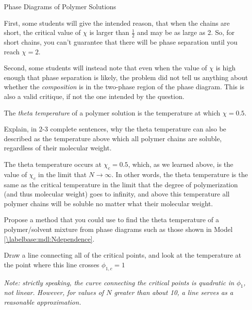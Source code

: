 \begin{activity}{Phase Diagrams of Polymer Solutions}
\begin{ctqs}
\begin{solution}[2.5in]{}
			First, some students will give the intended reason, that when the chains are short, the critical value of $\chi$ is larger than $\frac{1}{2}$ and may be as large as 2.  So, for short chains, you can't guarantee that there will be phase separation until you reach $\chi = 2$.
			
			Second, some students will instead note that even when the value of $\chi$ is high enough that phase separation is likely, the problem did not tell us anything about whether the \emph{composition} is in the two-phase region of the phase diagram.  This is also a valid critique, if not the one intended by the question.
		\end{solution}

\end{ctqs}


\begin{infobox}
	
	The \emph{theta temperature} of a polymer solution is the temperature at which $\chi=0.5$.
	
\end{infobox}


\begin{ctqs}

	\question Explain, in 2-3 complete sentences, why the theta temperature can also be described as the temperature above which all polymer chains are soluble, regardless of their molecular weight.
	
		\begin{solution}[2.25in]{}
			The theta temperature occurs at $\chi_c =0.5$, which, as we learned above, is the value of $\chi_c$ in the limit that $N\to\infty$.  In other words, the theta temperature is the same as the critical temperature in the limit that the degree of polymerization (and thus molecular weight) goes to infinity, and above this temperature all polymer chains will be soluble no matter what their molecular weight.
		\end{solution}
	
	\question Propose a method that you could use to find the theta temperature of a polymer/solvent mixture from phase diagrams such as those shown in Model \ref{\labelbase:mdl:Ndependence}.
	
		\begin{solution}[1.25in]{}
			Draw a line connecting all of the critical points, and look at the temperature at the point where this line crosses $\phi_{1,c} =1$
			
			\emph{Note: strictly speaking, the curve connecting the critical points is quadratic in $\phi_1$, not linear.  However, for values of $N$ greater than about 10, a line serves as a reasonable approximation.}
		\end{solution} 


\end{ctqs}
\end{activity}
